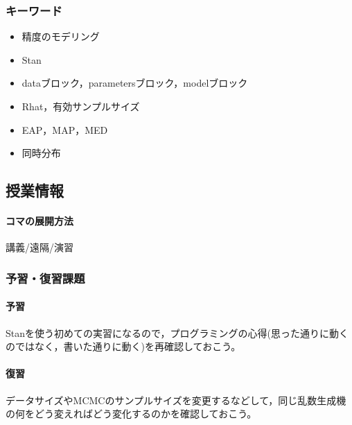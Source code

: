 \subsubsection{キーワード}
\begin{itemize}
    \item 精度のモデリング
    \item Stan
    \item dataブロック，parametersブロック，modelブロック
    \item Rhat，有効サンプルサイズ
    \item EAP，MAP，MED
    \item 同時分布
\end{itemize}
\subsection{授業情報}
\paragraph{コマの展開方法}
講義/遠隔/演習
\subsubsection{予習・復習課題}
\paragraph{予習}Stanを使う初めての実習になるので，プログラミングの心得(思った通りに動くのではなく，書いた通りに動く)を再確認しておこう。
\paragraph{復習}データサイズやMCMCのサンプルサイズを変更するなどして，同じ乱数生成機の何をどう変えればどう変化するのかを確認しておこう。